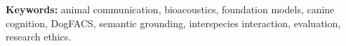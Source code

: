 \documentclass[11pt]{article}
\begin{document}
\vspace{0.2cm}
\noindent\textbf{Keywords:} animal communication, bioacoustics, foundation
models, canine cognition, DogFACS, semantic grounding, interspecies
interaction, evaluation, research ethics.

\newpage
\tableofcontents
\newpage















\end{document}
